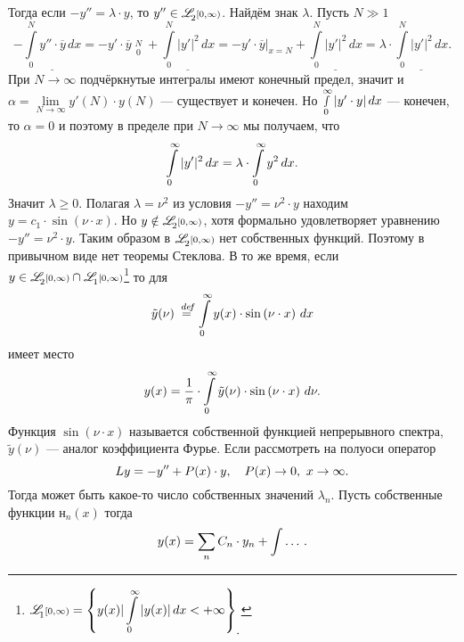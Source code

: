 \documentclass[12pt,a4paper,openany,fleqn]{book}
\newcommand {\defeq}{\stackrel{\hspace{0.09 cm}de\!f}{=}}
\newcommand {\eqdef}{\defeq}
\newcommand{\fL}[1][{[a,b]}]{\ensuremath{\mathscr{L}\hspace*{-0.11 cm}{\mathstrut}_{2}{\scriptstyle#1}}}
\newcommand{\fLone}[1][]{\ensuremath{\mathscr{L}\hspace*{-0.11 cm}{\mathstrut}_{1}{\scriptstyle#1}}}
\theoremstyle{definition}
\begin{document}
	Тогда если $-y''=\lambda\cdot y$, то $y''\in\fL[{[0,\infty)}]$. Найдём знак $\lambda$. Пусть $N\gg1$
	\begin{equation*}
		-\underline{\int\limits_0^N y''\cdot\overline{y}\,dx}=-y'\cdot\overline{y}\mathop{\Big|}\limits_{0}^{N}+\underline{\int\limits_0^N|y'|^2\,dx}=-y'\cdot\overline{y}\Big|_{x=N}+\underline{\int\limits_0^N|y'|^2\,dx}=\lambda\cdot\underline{\int\limits_0^N|y'|^2\,dx}.
	\end{equation*}    
	При $N\to\infty$ подчёркнутые интегралы имеют конечный предел, значит и $\alpha=\lim\limits_{N\to\infty}y'(N)\cdot y(N)$ --- существует и конечен. Но $\smallint\limits_0^{\infty}|y'\cdot y|\,dx$ --- конечен, то $\alpha=0$ и поэтому в пределе при $N\to\infty$ мы получаем, что
	\begin{equation*}
		\hfill\int\limits_0^{\infty}|y'|^2\,dx=\lambda\cdot\int\limits_0^{\infty}y^2\,dx.\hfill
	\end{equation*}
	Значит $\lambda\geqslant0$. Полагая $\lambda=\nu^2$ из условия $-y''=\nu^2\cdot y$ находим $y=c_1\cdot\sin\left(\nu\cdot x\right)$. Но $y\notin\fL[{[0,\infty)}]$, хотя формально удовлетворяет уравнению $-y''=\nu^2\cdot y$. Таким образом в $\fL[{[0,\infty)}]$ нет собственных функций. Поэтому в привычном виде нет теоремы Стеклова. В то же время, если $y\in\fL[{[0,\infty)}]\cap\fLone[{[0,\infty)}]$\footnote{$\displaystyle\fLone[{[0,\infty)}]=\left\{y(x)|\int\limits_{0}^{\infty}|y(x)|\,dx<+\infty\right\}_{\displaystyle.}$} то для 
	\begin{equation*}
		\hfill \tilde{y}(\nu)\eqdef\int\limits_0^{\infty}y(x)\cdot\sin\left(\nu\cdot x\right)\,dx\hfill
	\end{equation*}
	имеет место 
	\begin{equation*}
		\hfill y(x)=\frac{1}{\pi}\cdot\int\limits_0^{\infty}\tilde{y}(\nu)\cdot\sin\left(\nu\cdot x\right)\,d\nu.\hfill
	\end{equation*}
	Функция $\sin\left(\nu\cdot x\right)$ называется собственной функцией непрерывного спектра, $\tilde{y}(\nu)$ --- аналог коэффициента Фурье. Если рассмотреть на полуоси оператор 
	\begin{equation*}
		\hfill Ly=-y''+P(x)\cdot y,\quad P(x)\to0,\ x\to\infty.\hfill
	\end{equation*}
	Тогда может быть какое-то число собственных значений $\lambda_n$. Пусть собственные функции $н_n(x)$ тогда
	\begin{equation*}
		\hfill y(x)=\sum\limits_{n}C_n\cdot y_n+\int\dots\,.\hfill
	\end{equation*}
\end{document}
